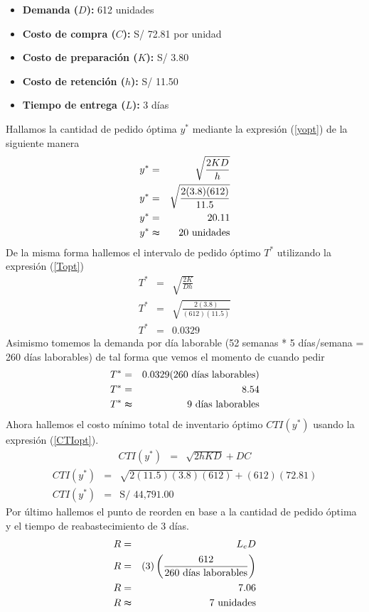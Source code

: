 \begin{itemize}
    \item \textbf{Demanda ($D$):} 612 unidades
    \item \textbf{Costo de compra ($C$):} S/ 72.81 por unidad
    \item \textbf{Costo de preparación ($K$):} S/ 3.80
    \item \textbf{Costo de retención ($h$):} S/ 11.50
    \item \textbf{Tiempo de entrega ($L$):} 3 días
\end{itemize}

Hallamos la cantidad de pedido óptima $y^*$ mediante la expresión (\ref{yopt}) de la siguiente manera
\begin{eqnarray}
    y^* &=& \sqrt{\frac{2KD}{h}} \nonumber \\
    y^* &=& \sqrt{\frac{2(3.8)(612)}{11.5}} \nonumber \\
    y^* &=& 20.11 \nonumber \\
    y^* &\thickapprox& 20 \text{ unidades} \nonumber
\end{eqnarray}
De la misma forma hallemos el intervalo de pedido óptimo $T^*$ utilizando la expresión (\ref{Topt}) 
\begin{eqnarray}
    T^* &=& \sqrt{\frac{2K}{Dh}} \nonumber \\
    T^* &=& \sqrt{\frac{2(3.8)}{(612)(11.5)}} \nonumber \\
    T^* &=& 0.0329 \nonumber
\end{eqnarray}
Asimismo tomemos la demanda por día laborable (52 semanas * 5 días/semana = 260 días laborables) de tal forma que vemos el momento de cuando pedir
\begin{eqnarray}
    T^* &=& 0.0329 (260 \text{ días laborables}) \nonumber \\   
    T^* &=& 8.54 \nonumber \\
    T^* &\thickapprox& 9 \text{ días laborables} \nonumber
\end{eqnarray}
Ahora hallemos el costo mínimo total de inventario óptimo $CTI(y^*)$ usando la expresión (\ref{CTIopt}).
\begin{eqnarray}
    CTI(y^*) &=& \sqrt{2hKD} + DC \nonumber
\end{eqnarray}
\begin{eqnarray}
    CTI(y^*) &=& \sqrt{2(11.5)(3.8)(612)} + (612)(72.81) \nonumber \\
    CTI(y^*) &=& \text{S/ 44,791.00} \nonumber
\end{eqnarray}
Por último hallemos el punto de reorden en base a la cantidad de pedido óptima y el tiempo de reabastecimiento de 3 días.
\begin{eqnarray}
    R &=& L_e D \nonumber \\
    R &=& (3) \left(\frac{612}{260 \text{ días laborables}} \right) \nonumber \\
    R &=& 7.06 \nonumber \\
    R &\thickapprox& 7 \text{ unidades} \nonumber
\end{eqnarray}

